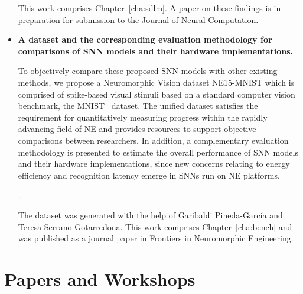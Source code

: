 \begin{itemize}
	This work comprises Chapter~\ref{cha:sdlm}.
	A paper on these findings is in preparation for submission to the Journal of Neural Computation.

	\item 
	\textbf{A dataset and the corresponding evaluation methodology for comparisons of SNN models and their hardware implementations.}

	To objectively compare these proposed SNN models with other existing methods, we propose a Neuromorphic Vision dataset NE15-MNIST which is comprised of spike-based visual stimuli based on a standard computer vision benchmark, the MNIST~\citep{lecun1998gradient} dataset.
	The unified dataset satisfies the requirement for quantitatively measuring progress within the rapidly advancing field of NE and provides resources to support objective comparisons between researchers.
	In addition, a complementary evaluation methodology is presented to estimate the overall performance of SNN models and their hardware implementations, since new concerns relating to energy efficiency and recognition latency emerge in SNNs run on NE platforms.

	\DIFdelbegin {}\DIFdelend \DIFaddbegin {}\DIFaddend .

	The dataset was generated with the help of Garibaldi Pineda-Garc\'ia and Teresa Serrano-Gotarredona.
	This work comprises Chapter~\ref{cha:bench} and was published as a journal paper in Frontiers in Neuromorphic Engineering.
\end{itemize}

   
\section{Papers and Workshops}

